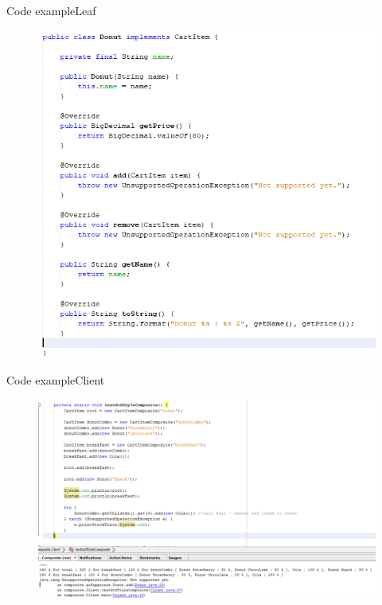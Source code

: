 \documentclass{beamer}
\begin{document}
\begin{frame}{Code example}{Leaf}
    \begin{figure}[h]
        \centering
        \includegraphics[width=\textwidth]{donutLeaf}
    \end{figure}
\end{frame}

\begin{frame}{Code example}{Client}
    \begin{figure}[h]
        \centering
        \includegraphics[width=\textwidth]{compositeTest}
    \end{figure}
\end{frame}
\end{document}
